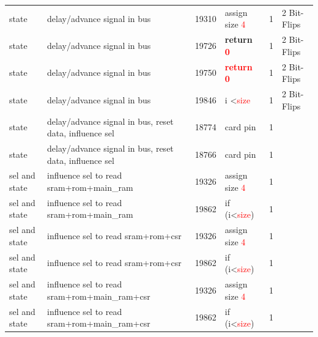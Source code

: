 \begin{table}
{\begin{tabular}{llllll}
state & delay/advance signal in bus & 19310 & assign size \textcolor{red}{4} & 1 & 2 Bit-Flips \\
state & delay/advance signal in bus & 19726 & \textbf{return \textcolor{red}{0}} & 1 & 2 Bit-Flips \\
state & delay/advance signal in bus & 19750 & \textbf{\textcolor{red}{return 0}} & 1 & 2 Bit-Flips \\
state & delay/advance signal in bus & 19846 & i \textless \textcolor{red}{size} & 1 & 2 Bit-Flips \\
state & delay/advance signal in bus, reset data, influence sel & 18774 & card pin & 1 &  \\
state & delay/advance signal in bus, reset data, influence sel & 18766 & card pin & 1 &  \\
sel and state & influence sel to read sram+rom+main\_ram & 19326 & assign size \textcolor{red}{4} & 1 &  \\
sel and state & influence sel to read sram+rom+main\_ram & 19862 & if (i\textless{}\textcolor{red}{size}) & 1 &  \\
sel and state & influence sel to read sram+rom+csr & 19326 & assign size \textcolor{red}{4} & 1 &  \\
sel and state & influence sel to read sram+rom+csr & 19862 & if (i\textless{}\textcolor{red}{size}) & 1 &  \\
sel and state & influence sel to read sram+rom+main\_ram+csr & 19326 & assign size \textcolor{red}{4} & 1 &  \\
sel and state & influence sel to read sram+rom+main\_ram+csr & 19862 & if (i\textless{}\textcolor{red}{size}) & 1 & \\
\bottomrule
\end{tabular}
}
\end{table}

